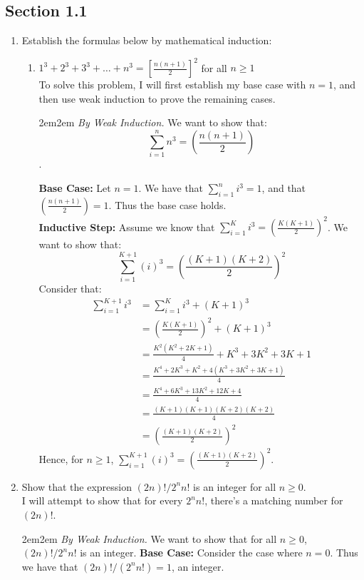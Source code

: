 \documentclass[10pt,oneside]{book}
\newcommand{\gspc}{\vspace{0.13cm}} %
\newcommand{\gline}{\gspc\\} %
\let\endoldproof\endproof
\renewenvironment{proof}[1][\proofname]
  {\vspace{0.2cm}\begin{adjustwidth}{2em}{2em}
   \oldproof[#1]}
  {\endoldproof
\end{adjustwidth}}
\begin{document}
\newcommand{\cg}[1]{\color{OliveGreen}#1\color{white}}
\newcommand{\cb}[1]{\color{BlueViolet}#1\color{white}}

\subsection*{Section 1.1}

\begin{enumerate}
	\item Establish the formulas below by mathematical induction:
	\begin{enumerate}
		\item [(e)] $1^3 + 2^3 + 3^3+ \ldots + n^3 =\left[\frac{n(n+1)}{2}\right]^2$ for all $n\ge 1$\gline
		To solve this problem, I will first establish my base case with $n = 1$, and then use weak induction to prove the remaining cases.
		\begin{proof}
			\textit{By Weak Induction.} We want to show that: 
			\[\sum_{i=1}^{n}n^3 = \left(\frac{n(n+1)}2\right)\].
		\end{proof}
		\textbf{Base Case: } Let $n = 1$. We have that $\sum_{i=1}^{n}i^3 = 1$, and that $\left(\frac{n(n+1)}2\right)=1$. Thus the base case holds. \gline
		\textbf{Inductive Step: }Assume we know that $\sum_{i=1}^{K}i^3 = \left(\frac{K(K+1)}2\right)^2$. We want to show that:
		\[\sum_{i=1}^{K+1}(i)^3 = \left(\frac{(K+1)(K+2)}2\right)^2\]
		Consider that:
		\begin{align*}
			\sum_{i=1}^{K+1}i^3 &=\sum_{i=1}^{K}i^3 + (K+1)^3\\
			&= \left(\frac{K(K+1)}{2}\right)^2 + (K+1)^3\\
			&= \frac{K^2(K^2+2K+1)}{4} + K^3 + 3K^2 + 3K + 1\\
			&= \frac{K^4+2K^3+K^2 + 4(K^3+3K^2+3K+1)}{4}\\
			&= \frac{K^4+6K^3+13K^2+12K+4}4\\
			&= \frac{(K+1)(K+1)(K+2)(K+2)}{4}\\
			&= \left(\frac{(K+1)(K+2)}{2}\right)^2
		\end{align*}
		Hence, for $n\ge 1$, $\sum_{i=1}^{K+1}(i)^3 = \left(\frac{(K+1)(K+2)}2\right)^2$.
	\end{enumerate}
	\item [11.] Show that the expression $(2n)!/2^nn!$ is an integer for all $n\ge 0$. \gline
	I will attempt to show that for every $2^nn!$, there's a matching number for $(2n)!$.
	\begin{proof}
		\textit{By Weak Induction.} We want to show that for all $n\ge 0$, $(2n)!/2^nn!$ is an integer. \textbf{Base Case:} Consider the case where $n = 0$. Thus we have that $(2n)!/(2^nn!) = 1$, an integer. \gline

\end{proof}
\end{enumerate}
\end{document}
